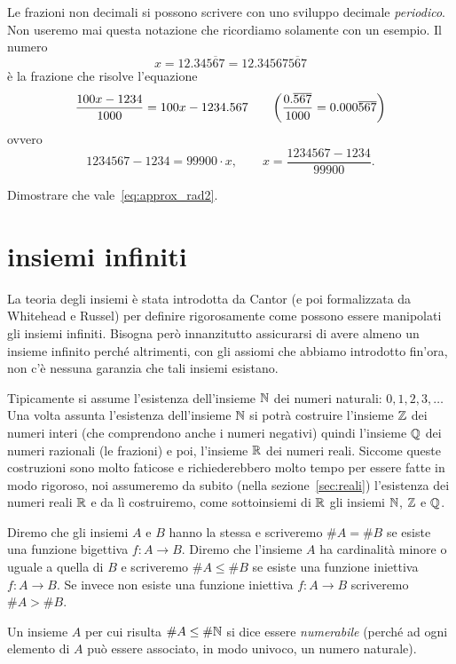 Le frazioni non decimali si possono scrivere con uno sviluppo
decimale \emph{periodico}. Non useremo mai questa notazione
che ricordiamo solamente con un esempio.
Il numero
\[
  x = 12.34\overline{567}
    = 12.34567\overline{567}
\]
è la frazione che risolve l'equazione
\[
  \frac{100x - 1234}{1000}
  = 100x-1234.567
  \qquad
{\left( \frac{0.\overline{567}}{1000}
= 0.000\overline{567}  \right)}
\]
ovvero
\[
  1234567 - 1234 = 99900 \cdot x,
  \qquad x = \frac{1234567-1234}{99900}.
\]

\begin{exercise}
Dimostrare che vale~\eqref{eq:approx_rad2}.
\end{exercise}

\section{insiemi infiniti}

La teoria degli insiemi è stata introdotta da Cantor (e poi formalizzata
da Whitehead e Russel) per definire rigorosamente come possono essere
manipolati gli insiemi infiniti. Bisogna però innanzitutto assicurarsi
di avere almeno un insieme infinito perché altrimenti, con gli assiomi
che abbiamo introdotto fin'ora, non c'è nessuna garanzia che tali insiemi esistano.

Tipicamente si assume l'esistenza dell'insieme $\mathbb N$ dei numeri naturali: $0,1,2,3,\dots$
Una volta assunta l'esistenza dell'insieme $\mathbb N$ si potrà costruire l'insieme
$\mathbb Z$ dei numeri interi (che comprendono anche i numeri negativi) quindi
l'insieme $\mathbb Q$ dei numeri razionali (le frazioni) e poi,
l'insieme $\mathbb R$ dei numeri reali.
Siccome queste costruzioni sono molto faticose
e richiederebbero molto tempo per essere fatte in modo rigoroso, noi
assumeremo da subito (nella sezione~\ref{sec:reali})
l'esistenza dei numeri reali $\mathbb R$ e da lì costruiremo,
come sottoinsiemi di $\mathbb R$ gli insiemi $\mathbb N$, $\mathbb Z$ e $\mathbb Q$.

\begin{definition}[cardinalità]
Diremo che gli insiemi $A$ e $B$ hanno la stessa 
e scriveremo $\# A = \# B$
se esiste una funzione bigettiva $f\colon A \to B$.
Diremo che l'insieme $A$ ha cardinalità minore o uguale a quella di $B$
e scriveremo $\#A \le \#B$ se esiste una funzione iniettiva $f\colon A \to B$.
Se invece non esiste una funzione iniettiva $f\colon A \to B$ scriveremo
$\#A > \#B$.

Un insieme $A$ per cui risulta $\#A \le \#\mathbb N$ si dice essere \emph{numerabile}
(perché ad ogni elemento di $A$ può essere associato, in modo univoco, un numero
naturale).
\end{definition}

